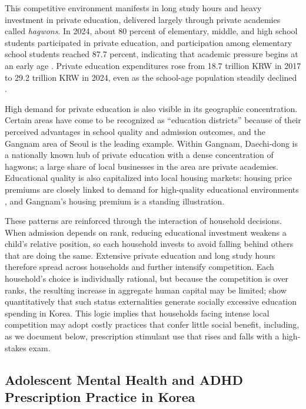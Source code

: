 \documentclass[12pt]{article}
\begin{document}
This competitive environment manifests in long study hours and heavy investment in private education, delivered largely through private academies called \textit{hagwons}. In 2024, about 80 percent of elementary, middle, and high school students participated in private education, and participation among elementary school students reached 87.7 percent, indicating that academic pressure begins at an early age \citep{statkorea2025}. Private education expenditures rose from 18.7 trillion KRW in 2017 to 29.2 trillion KRW in 2024, even as the school-age population steadily declined \citep{statkorea2025}.

High demand for private education is also visible in its geographic concentration. Certain areas have come to be recognized as ``education districts'' because of their perceived advantages in school quality and admission outcomes, and the Gangnam area of Seoul is the leading example. Within Gangnam, Daechi-dong is a nationally known hub of private education with a dense concentration of hagwons; a large share of local businesses in the area are private academies. Educational quality is also capitalized into local housing markets: housing price premiums are closely linked to demand for high-quality educational environments \citep{black1999,gibbons2003}, and Gangnam's housing premium is a standing illustration.

These patterns are reinforced through the interaction of household decisions. When admission depends on rank, reducing educational investment weakens a child's relative position, so each household invests to avoid falling behind others that are doing the same. Extensive private education and long study hours therefore spread across households and further intensify competition. Each household's choice is individually rational, but because the competition is over ranks, the resulting increase in aggregate human capital may be limited; \citet{kim2024} show quantitatively that such status externalities generate socially excessive education spending in Korea. This logic implies that households facing intense local competition may adopt costly practices that confer little social benefit, including, as we document below, prescription stimulant use that rises and falls with a high-stakes exam.

\subsection{Adolescent Mental Health and ADHD Prescription Practice in Korea}
\end{document}
